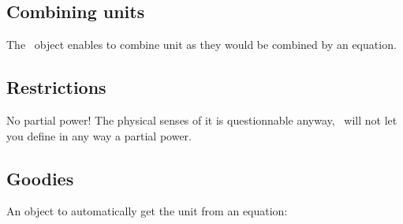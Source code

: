 \subsection{Combining units}

The \Units\ object enables to combine unit
as they would be combined by an equation.


\subsection{Restrictions}
No partial power! The physical senses of it is questionnable
anyway, \Antioch\ will not let you define in any way
a partial power.
\subsection{Goodies}
An object to automatically get the unit
from an equation:
{\footnotesize

}
